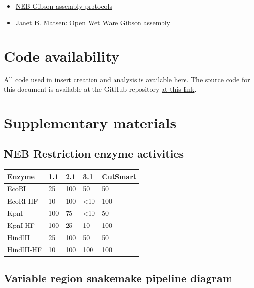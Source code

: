 \documentclass[11pt]{article}
\begin{document}
\begin{itemize}
	\item \href{https://www.neb.com/applications/cloning-and-synthetic-biology/dna-assembly-and-cloning/gibson-assembly}{NEB Gibson assembly protocols}
	\item \href{https://openwetware.org/wiki/Janet_B._Matsen:Guide_to_Gibson_Assembly}{Janet B. Matsen: Open Wet Ware Gibson assembly}
\end{itemize}


\section{Code availability}

All code used in insert creation and analysis is available here. The source code for this document is available at the GitHub repository \href{https://github.com/EthanHolleman/plasmid-VR-design}{at this link}.

\section{Supplementary materials}

\subsection{NEB Restriction enzyme activities}

\begin{table}[H]
	\centering
	\begin{tabular}{@{}lllll@{}}
		\toprule
		Enzyme     & 1.1 & 2.1 & 3.1           & CutSmart \\ \midrule
		EcoRI      & 25  & 100 & 50            & 50       \\
		EcoRI-HF   & 10  & 100 & \textless{}10 & 100      \\
		KpnI       & 100 & 75  & \textless{}10 & 50       \\
		KpnI-HF    & 100 & 25  & 10            & 100      \\
		HindIII    & 25  & 100 & 50            & 50       \\
		HindIII-HF & 10  & 100 & 100           & 100      \\ \bottomrule
	\end{tabular}
\end{table}

\subsection{Variable region snakemake pipeline diagram}
\end{document}
